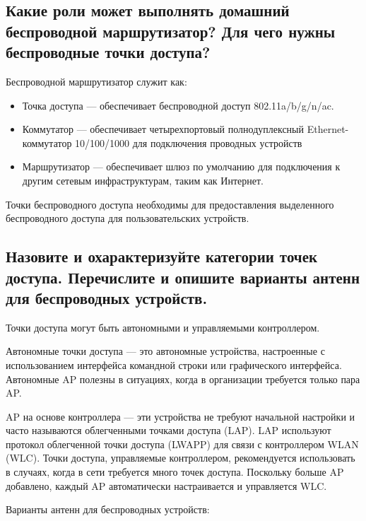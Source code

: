 \subsection{Какие роли может выполнять домашний беспроводной 
маршрутизатор? Для чего нужны беспроводные точки доступа?}

Беспроводной маршрутизатор служит как:

\begin{itemize}
	\item Точка доступа --- обеспечивает беспроводной доступ 
		802.11a/b/g/n/ac.
	\item Коммутатор --- обеспечивает четырехпортовый полнодуплексный 
		Ethernet-коммутатор 10/100/1000 для подключения проводных 
		устройств
	\item Маршрутизатор --- обеспечивает шлюз по умолчанию для 
		подключения к другим сетевым инфраструктурам, таким как 
		Интернет.
\end{itemize}

Точки беспроводного доступа необходимы для предоставления 
выделенного беспроводного доступа для пользовательских устройств.

\subsection{Назовите и охарактеризуйте категории точек доступа. 
Перечислите и опишите варианты антенн для беспроводных 
устройств.}

Точки доступа могут быть автономными и управляемыми 
контроллером.\par
Автономные точки доступа --- это автономные устройства, 
настроенные с использованием интерфейса командной строки или 
графического интерфейса. Автономные AP полезны в ситуациях, когда в 
организации требуется только пара AP. \par
AP на основе контроллера --- эти устройства не требуют начальной 
настройки и часто называются облегченными точками доступа (LAP). LAP 
используют протокол облегченной точки доступа (LWAPP) для связи с 
контроллером WLAN (WLC). Точки доступа, управляемые контроллером, 
рекомендуется использовать в случаях, когда в сети требуется много точек 
доступа. Поскольку больше AP добавлено, каждый AP автоматически 
настраивается и управляется WLC.\par
Варианты антенн для беспроводных устройств:

